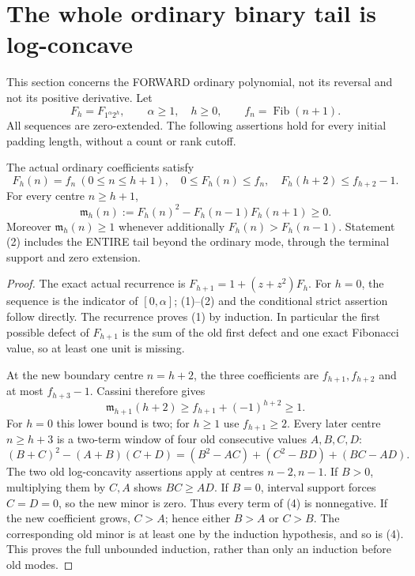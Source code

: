\section{The whole ordinary binary tail is log-concave}
This section concerns the FORWARD ordinary polynomial, not its reversal
and not its positive derivative.  Let
\[
 F_h=F_{1^\alpha2^h},\qquad\alpha\ge1,\quad h\ge0,
 \qquad f_n=\operatorname{Fib}(n+1).
\]
All sequences are zero-extended.  The following assertions hold for
every initial padding length, without a count or rank cutoff.

\begin{theorem}
The actual ordinary coefficients satisfy
\[
 F_h(n)=f_n\ (0\le n\le h+1),\quad
 0\le F_h(n)\le f_n,\quad F_h(h+2)\le f_{h+2}-1.       \tag{1}
\]
For every centre $n\ge h+1$,
\[
 \mathfrak m_h(n):=F_h(n)^2-F_h(n-1)F_h(n+1)\ge0.      \tag{2}
\]
Moreover $\mathfrak m_h(n)\ge1$ whenever additionally
$F_h(n)>F_h(n-1)$.  Statement (2) includes the ENTIRE tail
beyond the ordinary mode, through the terminal support and zero extension.
\end{theorem}
\begin{proof}
The exact actual recurrence is $F_{h+1}=1+(z+z^2)F_h$.
For $h=0$, the sequence is the indicator of $[0,\alpha]$;
(1)--(2) and the conditional strict assertion follow directly.
The recurrence proves (1) by induction.  In particular the first
possible defect of $F_{h+1}$ is the sum of the old first defect
and one exact Fibonacci value, so at least one unit is missing.

At the new boundary centre $n=h+2$, the three coefficients are
$f_{h+1}, f_{h+2}$ and at most $f_{h+3}-1$.
Cassini therefore gives
\[
 \mathfrak m_{h+1}(h+2)
       \ge f_{h+1}+(-1)^{h+2}\ge1.                      \tag{3}
\]
For $h=0$ this lower bound is two; for $h\ge1$ use
$f_{h+1}\ge2$.  Every later centre $n\ge h+3$ is a
two-term window of four old consecutive values $A,B,C,D$:
\[
 (B+C)^2-(A+B)(C+D)
   =(B^2-AC)+(C^2-BD)+(BC-AD).                          \tag{4}
\]
The two old log-concavity assertions apply at centres $n-2,n-1$.
If $B>0$, multiplying them by $C,A$ shows $BC\ge AD$.
If $B=0$, interval support forces $C=D=0$, so the new minor
is zero.  Thus every term of (4) is nonnegative.
If the new coefficient grows, $C>A$; hence either $B>A$ or
$C>B$.  The corresponding old minor is at least one by the
induction hypothesis, and so is (4).  This proves the full
unbounded induction, rather than only an induction before old modes.
\end{proof}

